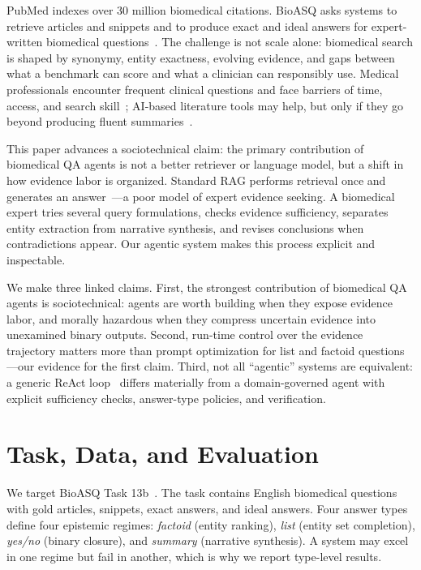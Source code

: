 \documentclass[sigconf,anonymous,review]{acmart}
\begin{document}
PubMed indexes over 30 million biomedical citations.
BioASQ asks systems to retrieve articles and snippets and to produce exact and ideal answers for expert-written biomedical questions~\cite{bioasq2025,bioasq2025b}.
The challenge is not scale alone: biomedical search is shaped by synonymy, entity exactness, evolving evidence, and gaps between what a benchmark can score and what a clinician can responsibly use.
Medical professionals encounter frequent clinical questions and face barriers of time, access, and search skill~\cite{daei2020clinical}; AI-based literature tools may help, but only if they go beyond producing fluent summaries~\cite{gu2021domain}.

This paper advances a sociotechnical claim: the primary contribution of biomedical QA agents is not a better retriever or language model, but a shift in how evidence labor is organized.
Standard RAG performs retrieval once and generates an answer~\cite{lewis2020retrieval}---a poor model of expert evidence seeking.
A biomedical expert tries several query formulations, checks evidence sufficiency, separates entity extraction from narrative synthesis, and revises conclusions when contradictions appear.
Our agentic system makes this process explicit and inspectable.

We make three linked claims.
First, the strongest contribution of biomedical QA agents is sociotechnical: agents are worth building when they expose evidence labor, and morally hazardous when they compress uncertain evidence into unexamined binary outputs.
Second, run-time control over the evidence trajectory matters more than prompt optimization for list and factoid questions---our evidence for the first claim.
Third, not all ``agentic'' systems are equivalent: a generic ReAct loop~\cite{yao2023react} differs materially from a domain-governed agent with explicit sufficiency checks, answer-type policies, and verification.

\section{Task, Data, and Evaluation}

We target BioASQ Task 13b~\cite{bioasq2026}.
The task contains English biomedical questions with gold articles, snippets, exact answers, and ideal answers.
Four answer types define four epistemic regimes: \emph{factoid} (entity ranking), \emph{list} (entity set completion), \emph{yes/no} (binary closure), and \emph{summary} (narrative synthesis).
A system may excel in one regime but fail in another, which is why we report type-level results.
\end{document}
